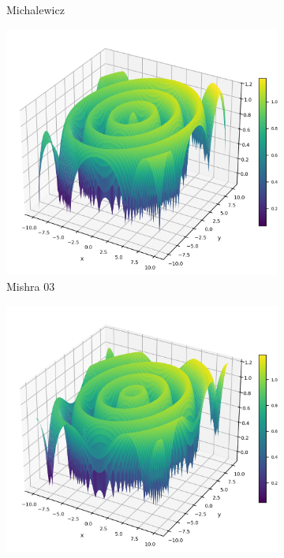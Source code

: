 \begin{figure}[p]
\begin{subfigure}{0.32\textwidth}
        \caption{Michalewicz}
    \end{subfigure}
    \begin{subfigure}{0.32\textwidth}
        \centering
        \includegraphics[width=1\textwidth]{Figures/benchmark_plots/Mishra_N3_maximized.png}
        \caption{Mishra 03}
    \end{subfigure}
    \begin{subfigure}{0.48\textwidth}
        \centering
        \includegraphics[width=1\textwidth]{Figures/benchmark_plots/Mishra_N4_maximized.png}

\end{subfigure}
\end{figure}
